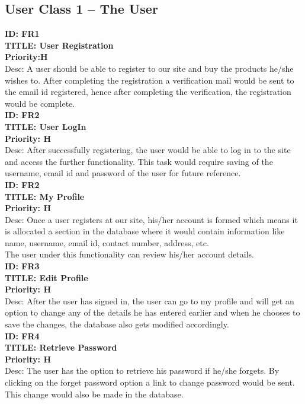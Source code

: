 \documentclass{scrreprt}
\begin{document}
\subsection{User Class 1 – The User} 
 \textbf{ID: FR1}\\
 \textbf{TITLE: User Registration}\\
 \textbf{Priority:H}\\
Desc: A user should be able to register to our site and buy the products he/she wishes to. After completing the registration a verification mail would be sent to the email id registered, hence after completing the verification, the registration would be complete.\\

 \textbf{ID: FR2}\\
 \textbf{TITLE: User LogIn}\\
 \textbf{Priority: H}  \\
Desc: After successfully registering, the user  would be able to log in to the site and access the further functionality. This task would require saving of the username, email id and password of the user for future reference.\\

 \textbf{ID: FR2}\\
 \textbf{TITLE: My Profile}\\
 \textbf{Priority: H}\\
Desc: Once a user registers at our site, his/her account is formed which means it is allocated a section in the database where it would contain information like name, username, email id, contact number, address, etc.\\
The user under this functionality can review his/her account details.\\

 \textbf{ID: FR3}\\
 \textbf{TITLE: Edit Profile}\\
\textbf{Priority: H}\\
Desc:  After the user has signed in, the user can go to my profile and will get an option to change any of the details he has entered earlier  and when he chooses to save the changes, the database also gets modified accordingly.\\

 \textbf{ID: FR4}\\
 \textbf{TITLE: Retrieve Password}\\
 \textbf{Priority: H}\\
Desc: The user has the option to retrieve his password if he/she forgets. By clicking on the forget password option a link to change password would be sent. This change would also be made in the database.\\
\end{document}
